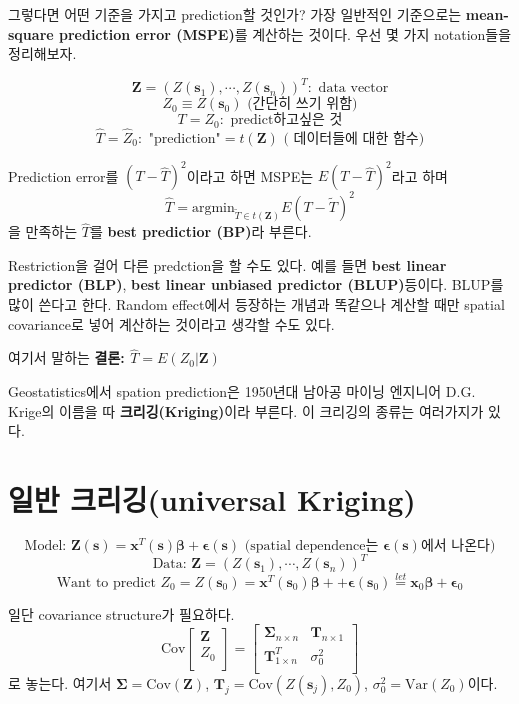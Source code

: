 \documentclass[b5paper,]{scrbook}
\theoremstyle{plain}
\theoremstyle{definition}
\numberwithin{equation}{section}
\begin{document}
그렇다면 어떤 기준을 가지고 prediction할 것인가? 가장 일반적인
기준으로는 \textbf{mean-square prediction error (MSPE)}를 계산하는
것이다. 우선 몇 가지 notation들을 정리해보자.

\[\mathbf{Z}=(Z(\mathbf{s}_{1}), \cdots , Z(\mathbf{s}_{n}))^{T}: \text{ data vector}\]
\[Z_{0}\equiv Z(\mathbf{s}_{0}) \text{ (간단히 쓰기 위함)}\]
\[T=Z_{0}: \text{ predict하고싶은 것}\]
\[\hat{T}=\hat{Z}_{0}: \text{ "prediction"}=t(\mathbf{Z}) \text{ ( 데이터들에 대한 함수)}\]

Prediction error를 \((T-\hat{T})^{2}\)이라고 하면 MSPE는
\(E(T-\hat{T})^{2}\)라고 하며
\[\hat{T}=\text{argmin}_{\tilde{T}\in t(\mathbf{Z})}E(T-\tilde{T})^{2}\]
을 만족하는 \(\hat{T}\)를 \textbf{best predictior (BP)}라 부른다.

Restriction을 걸어 다른 predction을 할 수도 있다. 예를 들면 \textbf{best
linear predictor (BLP)}, \textbf{best linear unbiased predictor
(BLUP)}등이다. BLUP를 많이 쓴다고 한다. Random effect에서 등장하는
개념과 똑같으나 계산할 때만 spatial covariance로 넣어 계산하는 것이라고
생각할 수도 있다.

여기서 말하는 \textbf{결론: \(\hat{T}=E(Z_{0}|\mathbf{Z})\)}

Geostatistics에서 spation prediction은 1950년대 남아공 마이닝 엔지니어
D.G. Krige의 이름을 따 \textbf{크리깅(Kriging)}이라 부른다. 이 크리깅의
종류는 여러가지가 있다.

\section{일반 크리깅(universal Kriging)}\label{-universal-kriging}

\[\text{Model: } \mathbf{Z}(\mathbf{s})=\mathbf{x}^{T}(\mathbf{s})\boldsymbol{\beta}+\boldsymbol{\epsilon}(\mathbf{s}) \text{ (spatial dependence는 } \boldsymbol{\epsilon}(\mathbf{s})\text{에서 나온다)}\]
\[\text{Data: } \mathbf{Z}=(Z(\mathbf{s}_{1}), \cdots , Z(\mathbf{s}_{n}))^{T}\]
\[\text{Want to predict } Z_{0}=Z(\mathbf{s}_{0})=\mathbf{x}^{T}(\mathbf{s}_{0})\boldsymbol{\beta}+\mathbf+\boldsymbol{\epsilon}(\mathbf{s}_{0})\stackrel{let}{=}\mathbf{x}_{0}\boldsymbol{\beta}+\boldsymbol{\epsilon}_{0}\]

일단 covariance structure가 필요하다. \[
\text{Cov}\left[\begin{array}
{r}
\mathbf{Z}\\
Z_{0}\\
\end{array}\right]
=
\left[\begin{array}
{rr}
\boldsymbol{\Sigma}_{n\times n} & \mathbf{T}_{n \times 1}\\
\mathbf{T}_{1\times n}^{T} & \sigma_{0}^{2}\\
\end{array}\right]
\] 로 놓는다. 여기서 \(\boldsymbol{\Sigma}=\text{Cov}(\mathbf{Z})\),
\(\mathbf{T}_{j}=\text{Cov}(Z(\mathbf{s}_{j}), Z_{0})\),
\(\sigma_{0}^{2}=\text{Var}(Z_{0})\)이다.
\end{document}
